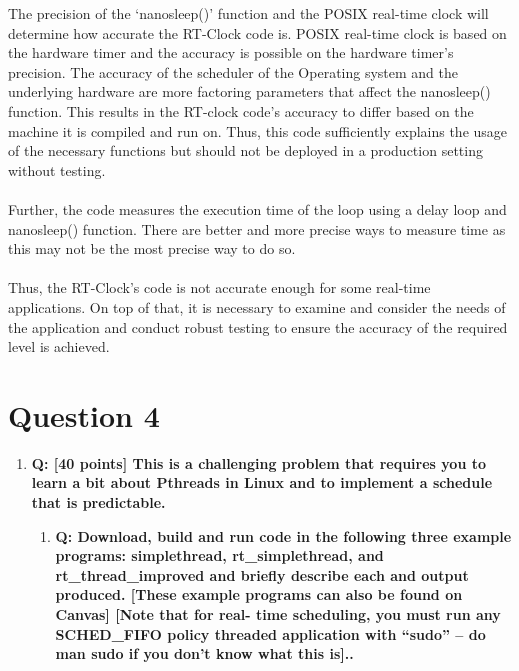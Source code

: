 \documentclass[a4paper,11pt]{article}%
\newenvironment{qanda}{\setlength{\parindent}{0pt}}{\bigskip}
\newcommand{\Q}{\bigskip\bfseries Q: }
\begin{document}
\begin{qanda}
\begin{enumerate}
\begin{enumerate}
				The precision of the ‘nanosleep()’ function and the POSIX real-time clock will determine how accurate the RT-Clock code is. POSIX real-time clock is based on the hardware timer and the accuracy is possible on the hardware timer’s precision. The accuracy of the scheduler of the Operating system and the underlying hardware are more factoring parameters that affect the nanosleep() function. This results in the RT-clock code’s accuracy to differ based on the machine it is compiled and run on. Thus, this code sufficiently explains the usage of the necessary functions but should not be deployed in a production setting without testing.\\\\
				Further, the code measures the execution time of the loop using a delay loop and nanosleep() function. There are better and more precise ways to measure time as this may not be the most precise way to do so.\\\\ 
				 Thus, the RT-Clock’s code is not accurate enough for some real-time applications. On top of that, it is necessary to examine and consider the needs of the application and conduct robust testing to ensure the accuracy of the required level is achieved.
			\end{enumerate}
	\end{enumerate}

	\section{Question 4}
	\begin{enumerate}
		\item[] \Q [40 points] This is a challenging problem that requires you to learn a bit about Pthreads in Linux and to implement a schedule that is predictable.
			\begin{enumerate}
				\item \Q          Download, build and run code in the following three example programs: simplethread,
				rt\_simplethread, and rt\_thread\_improved and briefly describe each and output produced. [These example programs can also be found on Canvas] [Note that for real- time scheduling, you must run any SCHED\_FIFO policy threaded application with “sudo” – do man sudo if you don’t know what this is]..


\end{enumerate}
\end{enumerate}
\end{qanda}
\end{document}
